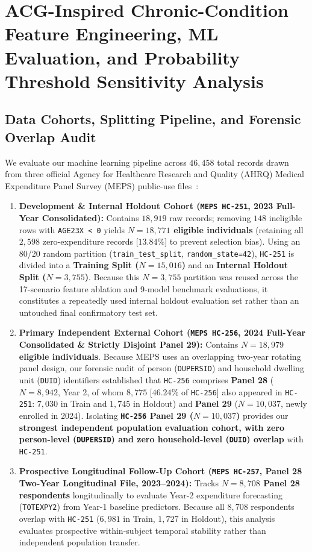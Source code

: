 \documentclass[runningheads]{llncs}
\begin{document}
\section{ACG-Inspired Chronic-Condition Feature Engineering, ML Evaluation, and Probability Threshold Sensitivity Analysis}

\subsection{Data Cohorts, Splitting Pipeline, and Forensic Overlap Audit}
We evaluate our machine learning pipeline across $46,458$ total records drawn from three official Agency for Healthcare Research and Quality (AHRQ) Medical Expenditure Panel Survey (MEPS) public-use files~\cite{ahrq_meps_2023}:
\begin{enumerate}
    \item \textbf{Development \& Internal Holdout Cohort (\texttt{MEPS HC-251}, 2023 Full-Year Consolidated):} Contains $18,919$ raw records; removing $148$ ineligible rows with \texttt{AGE23X < 0} yields \textbf{$N = 18,771$ eligible individuals} (retaining all $2,598$ zero-expenditure records [$13.84\%$] to prevent selection bias). Using an 80/20 random partition (\texttt{train\_test\_split}, \texttt{random\_state=42}), \texttt{HC-251} is divided into a \textbf{Training Split ($N = 15,016$)} and an \textbf{Internal Holdout Split ($N = 3,755$)}. Because this $N=3,755$ partition was reused across the 17-scenario feature ablation and 9-model benchmark evaluations, it constitutes a repeatedly used internal holdout evaluation set rather than an untouched final confirmatory test set.
    \item \textbf{Primary Independent External Cohort (\texttt{MEPS HC-256}, 2024 Full-Year Consolidated \& Strictly Disjoint Panel 29):} Contains \textbf{$N = 18,979$ eligible individuals}. Because MEPS uses an overlapping two-year rotating panel design, our forensic audit of person (\texttt{DUPERSID}) and household dwelling unit (\texttt{DUID}) identifiers established that \texttt{HC-256} comprises \textbf{Panel 28} ($N = 8,942$, Year 2, of whom $8,775$ [$46.24\%$ of \texttt{HC-256}] also appeared in \texttt{HC-251}: $7,030$ in Train and $1,745$ in Holdout) and \textbf{Panel 29} ($N = 10,037$, newly enrolled in 2024). Isolating \textbf{\texttt{HC-256} Panel 29 ($N = 10,037$)} provides our \textbf{strongest independent population evaluation cohort, with zero person-level (\texttt{DUPERSID}) and zero household-level (\texttt{DUID}) overlap} with \texttt{HC-251}.
    \item \textbf{Prospective Longitudinal Follow-Up Cohort (\texttt{MEPS HC-257}, Panel 28 Two-Year Longitudinal File, 2023--2024):} Tracks \textbf{$N = 8,708$ Panel 28 respondents} longitudinally to evaluate Year-2 expenditure forecasting (\texttt{TOTEXPY2}) from Year-1 baseline predictors. Because all $8,708$ respondents overlap with \texttt{HC-251} ($6,981$ in Train, $1,727$ in Holdout), this analysis evaluates prospective within-subject temporal stability rather than independent population transfer.
\end{enumerate}
\end{document}
